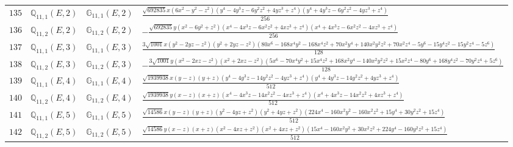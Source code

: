 \documentclass[fleqn,8pt,landscape]{jsarticle}
\begin{document}
\begin{table}[ht!]
\begin{center}
\begin{tabular}{cccl}
$ 135 $ & $ \mathbb{Q}_{11,1}(E,2) $ & $ \mathbb{G}_{11,1}(E,2) $ & $ \frac{\sqrt{692835} x \left(6 x^{2} - y^{2} - z^{2}\right) \left(y^{4} - 4 y^{3} z - 6 y^{2} z^{2} + 4 y z^{3} + z^{4}\right) \left(y^{4} + 4 y^{3} z - 6 y^{2} z^{2} - 4 y z^{3} + z^{4}\right)}{256} $ \\
$ 136 $ & $ \mathbb{Q}_{11,2}(E,2) $ & $ \mathbb{G}_{11,2}(E,2) $ & $ - \frac{\sqrt{692835} y \left(x^{2} - 6 y^{2} + z^{2}\right) \left(x^{4} - 4 x^{3} z - 6 x^{2} z^{2} + 4 x z^{3} + z^{4}\right) \left(x^{4} + 4 x^{3} z - 6 x^{2} z^{2} - 4 x z^{3} + z^{4}\right)}{256} $ \\
$ 137 $ & $ \mathbb{Q}_{11,1}(E,3) $ & $ \mathbb{G}_{11,1}(E,3) $ & $ \frac{3 \sqrt{1001} x \left(y^{2} - 2 y z - z^{2}\right) \left(y^{2} + 2 y z - z^{2}\right) \left(80 x^{6} - 168 x^{4} y^{2} - 168 x^{4} z^{2} + 70 x^{2} y^{4} + 140 x^{2} y^{2} z^{2} + 70 x^{2} z^{4} - 5 y^{6} - 15 y^{4} z^{2} - 15 y^{2} z^{4} - 5 z^{6}\right)}{128} $ \\
$ 138 $ & $ \mathbb{Q}_{11,2}(E,3) $ & $ \mathbb{G}_{11,2}(E,3) $ & $ - \frac{3 \sqrt{1001} y \left(x^{2} - 2 x z - z^{2}\right) \left(x^{2} + 2 x z - z^{2}\right) \left(5 x^{6} - 70 x^{4} y^{2} + 15 x^{4} z^{2} + 168 x^{2} y^{4} - 140 x^{2} y^{2} z^{2} + 15 x^{2} z^{4} - 80 y^{6} + 168 y^{4} z^{2} - 70 y^{2} z^{4} + 5 z^{6}\right)}{128} $ \\
$ 139 $ & $ \mathbb{Q}_{11,1}(E,4) $ & $ \mathbb{G}_{11,1}(E,4) $ & $ \frac{\sqrt{1939938} x \left(y - z\right) \left(y + z\right) \left(y^{4} - 4 y^{3} z - 14 y^{2} z^{2} - 4 y z^{3} + z^{4}\right) \left(y^{4} + 4 y^{3} z - 14 y^{2} z^{2} + 4 y z^{3} + z^{4}\right)}{512} $ \\
$ 140 $ & $ \mathbb{Q}_{11,2}(E,4) $ & $ \mathbb{G}_{11,2}(E,4) $ & $ \frac{\sqrt{1939938} y \left(x - z\right) \left(x + z\right) \left(x^{4} - 4 x^{3} z - 14 x^{2} z^{2} - 4 x z^{3} + z^{4}\right) \left(x^{4} + 4 x^{3} z - 14 x^{2} z^{2} + 4 x z^{3} + z^{4}\right)}{512} $ \\
$ 141 $ & $ \mathbb{Q}_{11,1}(E,5) $ & $ \mathbb{G}_{11,1}(E,5) $ & $ \frac{\sqrt{14586} x \left(y - z\right) \left(y + z\right) \left(y^{2} - 4 y z + z^{2}\right) \left(y^{2} + 4 y z + z^{2}\right) \left(224 x^{4} - 160 x^{2} y^{2} - 160 x^{2} z^{2} + 15 y^{4} + 30 y^{2} z^{2} + 15 z^{4}\right)}{512} $ \\
$ 142 $ & $ \mathbb{Q}_{11,2}(E,5) $ & $ \mathbb{G}_{11,2}(E,5) $ & $ \frac{\sqrt{14586} y \left(x - z\right) \left(x + z\right) \left(x^{2} - 4 x z + z^{2}\right) \left(x^{2} + 4 x z + z^{2}\right) \left(15 x^{4} - 160 x^{2} y^{2} + 30 x^{2} z^{2} + 224 y^{4} - 160 y^{2} z^{2} + 15 z^{4}\right)}{512} $ \\

\end{tabular}
\end{center}
\end{table}
\end{document}

